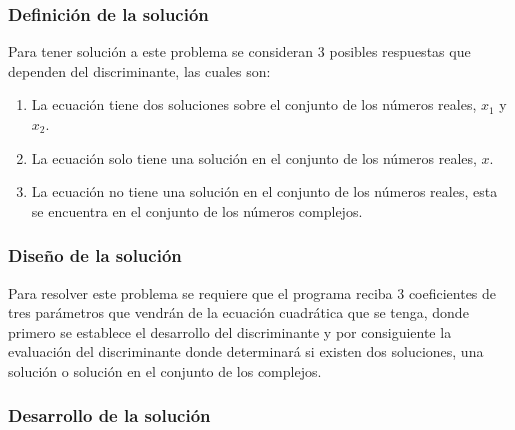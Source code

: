 \subsubsection{Definición de la solución}
Para tener solución a este problema se consideran 3 posibles respuestas que dependen del discriminante, las cuales son:
\begin{enumerate}
    \item La ecuación tiene dos soluciones sobre el conjunto de los números reales, $x_1$ y $x_2$.
    \item La ecuación solo tiene una solución en el conjunto de los números reales, $x$.
    \item La ecuación no tiene una solución en el conjunto de los números reales, esta se encuentra en el conjunto de los números complejos.
\end{enumerate}

\subsubsection{Diseño de la solución}
Para resolver este problema se requiere que el programa reciba 3 coeficientes de tres parámetros que vendrán de la ecuación cuadrática que se tenga, donde primero se establece el desarrollo del discriminante y por consiguiente la evaluación del discriminante donde determinará si existen dos soluciones, una solución o solución en el conjunto de los complejos.

\subsubsection{Desarrollo de la solución}

